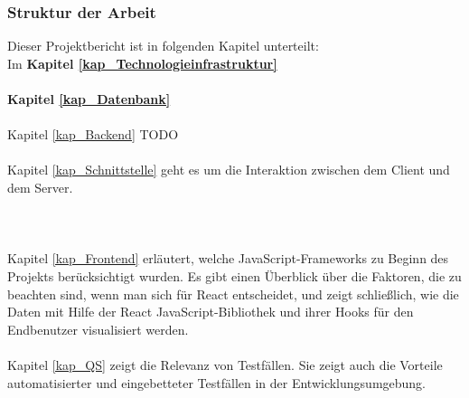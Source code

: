 \subsubsection*{Struktur der Arbeit}
Dieser Projektbericht ist in folgenden Kapitel unterteilt:\\
Im \textbf{Kapitel \ref{kap_Technologieinfrastruktur}}
\\\\
\textbf{Kapitel \ref{kap_Datenbank}}
\\\\
Kapitel \ref{kap_Backend} 
TODO
\\\\
Kapitel \ref{kap_Schnittstelle} geht es um die Interaktion zwischen dem Client und dem Server. 
\\\\
\\\\
Kapitel \ref{kap_Frontend} erläutert, welche JavaScript-Frameworks zu Beginn des Projekts berücksichtigt wurden. Es gibt einen Überblick über die Faktoren, die zu beachten sind, wenn man sich für React entscheidet, und zeigt schließlich, wie die Daten mit Hilfe der React JavaScript-Bibliothek und ihrer Hooks für den Endbenutzer visualisiert werden.
\\\\
Kapitel \ref{kap_QS} zeigt die Relevanz von Testfällen. Sie zeigt auch die Vorteile automatisierter und eingebetteter Testfällen in der Entwicklungsumgebung.

